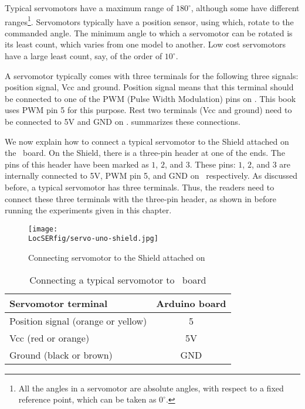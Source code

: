 Typical servomotors have a maximum range of $180^\circ$, although some
have different ranges\footnote{All the angles in a servomotor are
  absolute angles, with respect to a fixed reference point, which can
  be taken as $0^\circ$.}.
Servomotors typically have a position sensor,
using which, rotate to the commanded angle.  The minimum angle to
which a servomotor can be rotated is its least count, which varies
from one model to another.  Low cost servomotors have a large least
count, say, of the order of $10^\circ$.

A servomotor typically comes with three terminals for the
following three signals: position signal, Vcc and ground. 
Position signal means that this terminal should be connected to 
one of the PWM (Pulse Width Modulation) pins \cite{arduino-pwm} on \arduino. 
This book uses PWM pin 5 for this purpose. 
Rest two terminals (Vcc and ground) need to be connected to 5V and GND on \arduino. 
 summarizes these connections. 

We now explain how to connect a typical servomotor to the Shield attached 
on the \arduino\ board. On the Shield, there is a three-pin header at one of the 
ends. The pins of this header have been marked as $1$, $2$, and $3$. These pins:
$1$, $2$, and $3$ are internally connected to 5V, PWM pin 5, and GND on \arduino\, respectively.  
As discussed before, a typical servomotor has three terminals. Thus, the readers need to 
connect these three terminals with the three-pin header, as shown in 
before running the experiments given in this chapter. 

\begin{figure}
  \centering
  \texttt{[image: \\LocSERfig/servo-uno-shield.jpg]}
  \caption{Connecting servomotor to the Shield attached on \arduino}
  \label{fig:servo-shield}
\end{figure}


\begin{table}
  \centering
  \caption{Connecting a typical servomotor to \arduino\ board}
  \label{tab:servo-connect}
  \begin{tabular}{lc}\hline
    Servomotor terminal                & Arduino board \\ \hline
    Position signal (orange or yellow) & 5             \\
    Vcc (red or orange)                & 5V            \\
    Ground (black or brown)            & GND           \\ 
    \hline
  \end{tabular}
\end{table}



